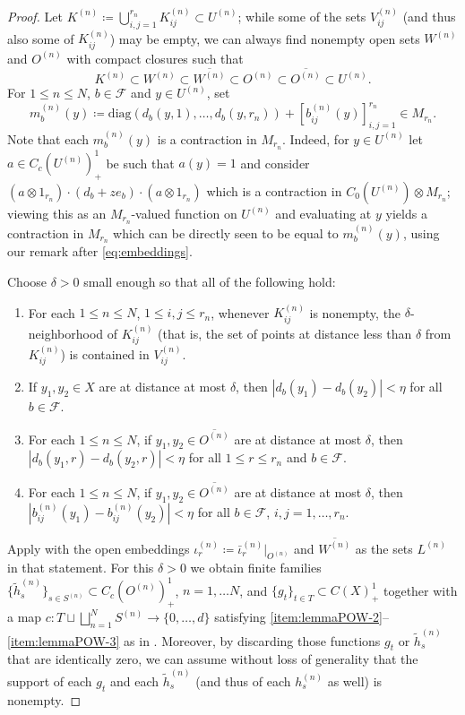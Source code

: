 \documentclass[11pt,a4paper]{amsart}
\theoremstyle{definition}
\numberwithin{equation}{section}
\newcommand{\mc}[1]{\mathcal{#1}}
\begin{document}
\begin{proof}
Let $K^{(n)}\coloneqq\bigcup_{i,j=1}^{r_n}K_{ij}^{(n)} \subset U^{(n)}$; while some of the sets $V_{ij}^{(n)}$ (and thus also some of $K_{ij}^{(n)}$) may be empty, we can always find nonempty open sets $W^{(n)}$ and $O^{(n)}$ with compact closures such that 
\begin{equation}\label{eq:subsets-chain}
K^{(n)}\subset W^{(n)} \subset\overline{W^{(n)}}\subset O^{(n)}\subset \overline{O^{(n)}}\subset U^{(n)}.
\end{equation}
For $1\le n\le N$, $b\in\mc{F}$ and $y\in U^{(n)}$, set
\begin{equation}\label{eq:mb}
m_b^{(n)}(y)\coloneqq\mathrm{diag}(d_b(y,1),\dots,d_b(y,r_n))+ [b_{ij}^{(n)}(y)]_{i,j=1}^{r_n}\in M_{r_n}.
\end{equation}
Note that each $m_b^{(n)}(y)$ is a contraction in $M_{r_n}$. Indeed, for $y\in U^{(n)}$ let $a\in C_c(U^{(n)})_+^1$ be such that $a(y)=1$ and consider $(a\otimes 1_{r_n})\cdot (d_b+ze_b)\cdot (a\otimes 1_{r_n})$ which is a contraction in $C_0(U^{(n)})\otimes M_{r_n}$; viewing this as an $M_{r_n}$-valued function on $U^{(n)}$ and evaluating at $y$ yields a contraction in $M_{r_n}$ which can be directly seen to be equal to $m_b^{(n)}(y)$, using our remark after \eqref{eq:embeddings}.

Choose $\delta>0$ small enough so that all of the following hold:
\begin{enumerate}[label=(\alph*)]
\item\label{item:delta-a}  For each $1\le n\le N$, $1\le i,j\le r_n$, whenever $K_{ij}^{(n)}$ is nonempty, the $\delta$-neighborhood of $K_{ij}^{(n)}$ (that is, the set of points at distance less than $\delta$ from $K_{ij}^{(n)}$) is contained in $V_{ij}^{(n)}$.
\item\label{item:delta-b} If $y_1,y_2\in X$ are at distance at most $\delta$, then $|d_b(y_1)-d_b(y_2)|<\eta$ for all $b\in\mc{F}$.
\item\label{item:delta-c} For each $1\le n\le N$, if $y_1,y_2\in \overline{O^{(n)}}$ are at distance at most $\delta$, then $|d_b(y_1,r)-d_b(y_2,r)|<\eta$ for all $1\le r\le r_n$ and $b\in\mc{F}$.
\item\label{item:delta-d} For each $1\le n\le N$, if $y_1,y_2\in \overline{O^{(n)}}$ are at distance at most $\delta$, then  $|b_{ij}^{(n)}(y_1)-b_{ij}^{(n)}(y_2)|<\eta$ for all $b\in\mc{F}$, $i,j=1,\dots,r_n$.
\end{enumerate}
Apply  with the open embeddings $\iota_r^{(n)}\coloneqq \bar\iota_r^{(n)}\vert_{O^{(n)}}$ and $\overline{W^{(n)}}$ as the sets $L^{(n)}$ in that statement. For this $\delta>0$ we obtain finite families $\{\tilde{h}_s^{(n)}\}_{s\in S^{(n)}}\subset C_c(O^{(n)})_+^1$, $n=1,\dots N$, and $\{g_t\}_{t\in T}\subset C(X)_+^1$ together with a map $c\colon T\sqcup\bigsqcup_{n=1}^NS^{(n)}\to\{0,\dots,d\}$ satisfying \ref{item:lemmaPOW-2}--\ref{item:lemmaPOW-3} as in . Moreover, by discarding those functions $g_t$ or $\tilde{h}_s^{(n)}$ that are identically zero, we can assume without loss of generality that the support of each $g_t$ and each $\tilde{h}_s^{(n)}$ (and thus of each $h_s^{(n)}$ as well) is nonempty.


\end{proof}
\end{document}
